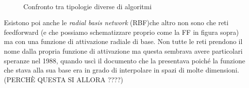 \begin{figure}[hbtb]
\centering
{} \quad
{} \quad
{}\\
\caption{Confronto tra tipologie diverse di algoritmi}
\label{fig:subfig}
\end{figure}

Esistono poi anche le \textit{radial basis network} (RBF)che altro non sono che reti feedforward (e che possiamo schematizzare proprio come la FF in figura sopra) ma con una funzione di attivazione radiale di base. Non tutte le reti prendono il nome dalla propria funzione di attivazione ma questa sembrava avere particolari speranze nel 1988, quando uscì il documento che la presentava poiché la funzione che stava alla sua base era in grado di interpolare in spazi di molte dimensioni.(PERCHÈ QUESTA SI ALLORA ????)
 
